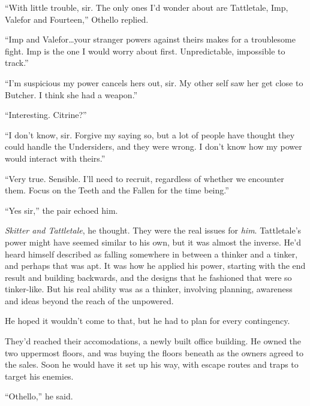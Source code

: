 ``With little trouble, sir.  The only ones I'd wonder about are Tattletale, Imp, Valefor and Fourteen,'' Othello replied.



``Imp and Valefor\ldots your stranger powers against theirs makes for a troublesome fight.  Imp is the one I would worry about first.  Unpredictable, impossible to track.''



``I'm suspicious my power cancels hers out, sir.  My other self saw her get close to Butcher.  I think she had a weapon.''



``Interesting.  Citrine?''



``I don't know, sir.  Forgive my saying so, but a lot of people have thought they could handle the Undersiders, and they were wrong.  I don't know how my power would interact with theirs.''



``Very true.  Sensible.  I'll need to recruit, regardless of whether we encounter them.  Focus on the Teeth and the Fallen for the time being.''



``Yes sir,'' the pair echoed him.



\emph{Skitter and Tattletale}, he thought.  They were the real issues for \emph{him}.  Tattletale's power might have seemed similar to his own, but it was almost the inverse.  He'd heard himself described as falling somewhere in between a thinker and a tinker, and perhaps that was apt.  It was how he applied his power, starting with the end result and building backwards, and the designs that he fashioned that were so tinker-like.  But his real ability was as a thinker, involving planning, awareness and ideas beyond the reach of the unpowered.



He hoped it wouldn't come to that, but he had to plan for every contingency.



They'd reached their accomodations, a newly built office building.  He owned the two uppermost floors, and was buying the floors beneath as the owners agreed to the sales.  Soon he would have it set up his way, with escape routes and traps to target his enemies.



``Othello,'' he said.



